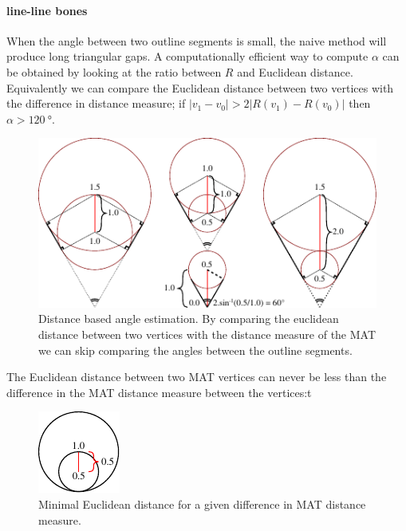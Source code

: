 \paragraph{line-line bones}
When the angle between two outline segments is small, the naive method will produce long triangular gaps.
A computationally efficient way to compute $\alpha$ can be obtained by looking at the ratio between $R$ and Euclidean distance.
Equivalently we can compare the Euclidean distance between two vertices with the difference in distance measure;
if $ |v_1 - v_0| > 2 | R(v_1) - R(v_0) |$ then $\alpha > \SI{120}{\degree}$.

\begin{figure}[H]
\centering
\includegraphics[width=.9\columnwidth]{sources/method/distance_based_angles.pdf}
\caption{Distance based angle estimation. By comparing the euclidean distance between two vertices with the distance measure of the MAT we can skip comparing the angles between the outline segments.}
\label{distance_based_angles}
\end{figure}

The Euclidean distance between two MAT vertices can never be less than the difference in the MAT distance measure between the vertices:t
\begin{figure}[H]
\centering
\includegraphics[width=.3\columnwidth]{sources/method/distance_ratio_limit.pdf}
\caption{Minimal Euclidean distance for a given difference in MAT distance measure.}
\label{distance_ratio_limit}
\end{figure}




